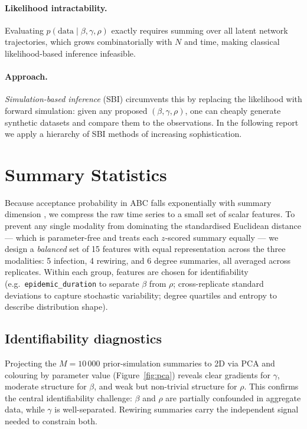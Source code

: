 \documentclass[11pt, a4paper]{article}
\begin{document}
\paragraph{Likelihood intractability.}
Evaluating $p(\text{data}\mid\beta,\gamma,\rho)$ exactly requires summing over
all latent network trajectories, which grows combinatorially with $N$ and time,
making classical likelihood-based inference infeasible.

\paragraph{Approach.}
\emph{Simulation-based inference} (SBI) circumvents this by replacing the
likelihood with forward simulation: given any proposed $(\beta,\gamma,\rho)$,
one can cheaply generate synthetic datasets and compare them to the observations.
In the following report we apply a hierarchy of SBI methods of increasing sophistication.

\section{Summary Statistics}
\label{sec:summaries}

Because acceptance probability in ABC falls exponentially with summary
dimension \citep{blum2013}, we compress the raw time series to a small
set of scalar features.
To prevent any single modality from dominating the standardised Euclidean distance
— which is parameter-free and treats each $z$-scored summary equally — we design
a \emph{balanced} set of 15 features with equal representation across the three
modalities: 5 infection, 4 rewiring, and 6 degree summaries, all averaged across
replicates.
Within each group, features are chosen for identifiability
(e.g.\ \texttt{epidemic\_duration} to separate $\beta$ from $\rho$;
cross-replicate standard deviations to capture stochastic variability;
degree quartiles and entropy to describe distribution shape).

\subsection{Identifiability diagnostics}

Projecting the $M=10\,000$ prior-simulation summaries to 2D via PCA and
colouring by parameter value (Figure~\ref{fig:pca}) reveals clear gradients
for $\gamma$, moderate structure for $\beta$, and weak but non-trivial
structure for $\rho$.
This confirms the central identifiability challenge: $\beta$ and $\rho$ are
partially confounded in aggregate data, while $\gamma$ is well-separated.
Rewiring summaries carry the independent signal needed to constrain both.
\end{document}
